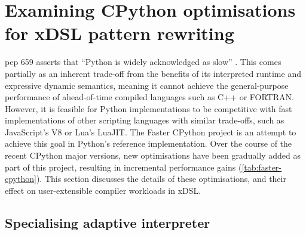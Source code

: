 \chapter{Examining CPython optimisations for xDSL pattern rewriting}
\label{chap:impact-cpython-pattern-rewriting}

\acf{pep} 659 asserts that ``Python is widely acknowledged as slow'' \cite{pep659}.
This comes partially as an inherent trade-off from the benefits of its interpreted runtime and expressive dynamic semantics, meaning it cannot achieve the general-purpose performance of ahead-of-time compiled languages such as C++ or FORTRAN. However, it is feasible for Python implementations to be competitive with fast implementations of other scripting languages with similar trade-offs, such as JavaScript's V8 or Lua's LuaJIT. The Faster CPython project is an attempt to achieve this goal in Python's reference implementation. Over the course of the recent CPython major versions, new optimisations have been gradually added as part of this project, resulting in incremental performance gains (\autoref{tab:faster-cpython}).
This section discusses the details of these optimisations, and their effect on user-extensible compiler workloads in xDSL.


\section{Specialising adaptive interpreter}
\label{sec:specialising-adaptive-interpreter}

